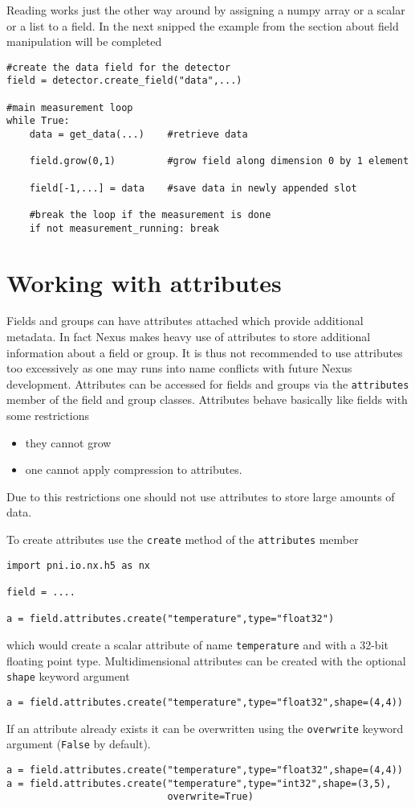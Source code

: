 Reading works just the other way around by assigning a numpy array or a scalar
or a list to a field. In the next snipped the example from the section about
field manipulation will be completed 
\begin{verbatim}
#create the data field for the detector
field = detector.create_field("data",...)

#main measurement loop
while True:
    data = get_data(...)    #retrieve data

    field.grow(0,1)         #grow field along dimension 0 by 1 element
   
    field[-1,...] = data    #save data in newly appended slot
   
    #break the loop if the measurement is done
    if not measurement_running: break

\end{verbatim}

\section{Working with attributes}\label{section:nexus:attributes}

Fields and groups can have attributes attached which provide additional
metadata. In fact Nexus makes heavy use of attributes to store additional 
information about a field or group. It is thus not recommended to use 
attributes too excessively as one may runs into name conflicts with future Nexus
development. 
Attributes can be accessed for fields  and groups via the {\tt attributes}
member of the field and group classes. Attributes behave basically like fields
with some restrictions
\begin{itemize}
    \item they cannot grow
    \item one cannot apply compression to attributes.
\end{itemize}
Due to this restrictions one should not use attributes to store large amounts of
data. 

To create attributes use the {\tt create} method of the {\tt attributes} member
\begin{verbatim}
import pni.io.nx.h5 as nx

field = ....

a = field.attributes.create("temperature",type="float32")
\end{verbatim}
which would create a scalar attribute of name {\tt temperature} and with a
32-bit floating point type. Multidimensional attributes can be created with the
optional {\tt shape} keyword argument
\begin{verbatim}
a = field.attributes.create("temperature",type="float32",shape=(4,4))
\end{verbatim}
If an attribute already exists it can be overwritten using the {\tt overwrite}
keyword argument ({\tt False} by default). 
\begin{verbatim}
a = field.attributes.create("temperature",type="float32",shape=(4,4))
a = field.attributes.create("temperature",type="int32",shape=(3,5),
                            overwrite=True)
\end{verbatim}

